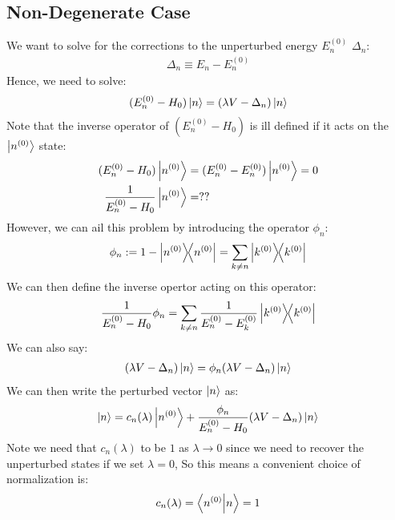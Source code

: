 \documentclass[12pt]{article}
\begin{document}
\subsection{Non-Degenerate Case}
We want to solve for the corrections to the unperturbed energy $E_n^{(0)}$ $\Delta_n$:
\begin{align*}
  \Delta_n\equiv E_n-E_n^{(0)}
\end{align*}
Hence, we need to solve:
\begin{equation}
  \label{eq:ndtipt}
  (E_n^{(0)}-H_0)\ket{n}=(\lambda V-\Delta_n)\ket{n}
\end{equation}
Note that the inverse operator of $(E_n^{(0)}-H_0)$ is ill defined if it acts on the $\ket{n^{(0)}}$ state:
\begin{align*}
  (E_n^{(0)}-H_0)\ket{n^{(0)}}&=(E_n^{(0)}-E_n^{(0)})\ket{n^{(0)}}=0\\
  \frac{1}{E_n^{(0)}-H_0}\ket{n^{(0)}} &= ??
\end{align*}
However, we can ail this problem by introducing the operator $\phi_n$:
\begin{align*}
  \phi_n:=1-\dyad{n^{(0)}}=\sum_{k\neq n}\dyad{k^{(0)}}
\end{align*}
We can then define the inverse opertor acting on this operator:
\begin{align*}
  \frac1{E_n^{(0)}-H_0}\phi_n=\sum_{k\neq n}
  \frac1{E_n^{(0)}-E_k^{(0)}}\dyad{k^{(0)}}
\end{align*}
We can also say:
\begin{align*}
  (\lambda V-\Delta_n)\ket{n}=\phi_n(\lambda V-\Delta_n)\ket{n}
\end{align*}
We can then write the perturbed vector $\ket{n}$ as:
\begin{align*}
  \ket{n}=c_n(\lambda)\ket{n^{(0)}}
  +\frac{\phi_n}{E_n^{(0)}-H_0}(\lambda V-\Delta_n)\ket{n}
\end{align*}
Note we need that $c_n(\lambda)$ to be $1$ as $\lambda\to0$ since we need to recover the unperturbed states if we set $\lambda=0$, So this means a convenient choice of normalization is:
\begin{align*}
  c_n(\lambda)=\ip{n^{(0)}}{n}=1
\end{align*}
\end{document}
